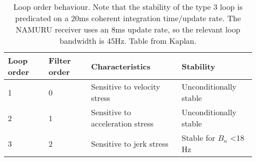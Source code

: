 \begin{table}[!htb]
\centering
\begin{tabular}{|l|l|l|l|}
\hline
\rowcolor[HTML]{C0C0C0} 
Loop order & Filter order & Characteristics & Stability                               \\ \hline
1          & 0            & Sensitive to velocity stress       & Unconditionally stable                                  \\ \hline
\rowcolor[HTML]{EFEFEF} 
2          & 1            & Sensitive to acceleration stress   & Unconditionally stable                                   \\ \hline
3          & 2            & Sensitive to jerk stress          & Stable for $B_n$ \textless 18 Hz \\ \hline
\end{tabular}
\caption{Loop order behaviour. Note that the stability of the type 3 loop is predicated on a 20ms coherent integration time/update rate. The \ac{NAMURU} receiver uses an 8ms update rate, so the relevant loop bandwidth is 45Hz. Table from Kaplan\cite{Kaplan}.}
\label{tab:LoopOrders}
\end{table}
